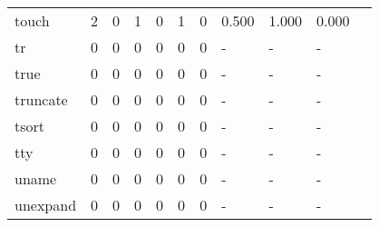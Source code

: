 \begin{longtable}{lp{1.10cm}p{1.10cm}p{1.10cm}p{1.10cm}p{1.10cm}p{1.10cm}p{1.10cm}p{1.10cm}p{1.10cm}p{1.10cm}}
touch     &                      2 &                                  0 &                                 1 &                                0 &                                 1 &                               0 &                          0.500 &                                 1.000 &                               0.000 \\
tr        &                      0 &                                  0 &                                 0 &                                0 &                                 0 &                               0 &                              - &                                     - &                                   - \\
true      &                      0 &                                  0 &                                 0 &                                0 &                                 0 &                               0 &                              - &                                     - &                                   - \\
truncate  &                      0 &                                  0 &                                 0 &                                0 &                                 0 &                               0 &                              - &                                     - &                                   - \\
tsort     &                      0 &                                  0 &                                 0 &                                0 &                                 0 &                               0 &                              - &                                     - &                                   - \\
tty       &                      0 &                                  0 &                                 0 &                                0 &                                 0 &                               0 &                              - &                                     - &                                   - \\
uname     &                      0 &                                  0 &                                 0 &                                0 &                                 0 &                               0 &                              - &                                     - &                                   - \\
unexpand  &                      0 &                                  0 &                                 0 &                                0 &                                 0 &                               0 &                              - &                                     - &                                   - \\

\end{longtable}
